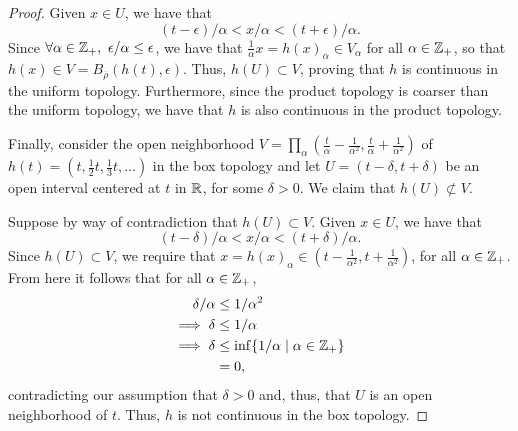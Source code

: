 \begin{solution}
\begin{proof}
        Given $x \in U$, we have that
        \begin{equation*}
            (t - \epsilon) / \alpha < x / \alpha < (t + \epsilon) / \alpha.
        \end{equation*}
        Since $\forall \alpha \in \mathbb{Z}_+,~ \epsilon / \alpha \leq \epsilon$, we have that $\tfrac{1}{\alpha} x = h(x)_\alpha \in V_\alpha$ for all $\alpha \in \mathbb{Z}_+$, so that $h(x) \in V = B_{\overline{\rho}}(h(t), \epsilon)$.
        Thus, $h(U) \subset V$, proving that $h$ is continuous in the uniform topology.
        Furthermore, since the product topology is coarser than the uniform topology, we have that $h$ is also continuous in the product topology.

        Finally, consider the open neighborhood $V = \prod_\alpha (\tfrac{t}{\alpha} - \tfrac{1}{\alpha^2}, \tfrac{t}{\alpha} + \tfrac{1}{\alpha^2})$ of $h(t) = (t, \tfrac{1}{2} t, \tfrac{1}{3} t, \ldots)$ in the box topology and let $U = (t - \delta, t + \delta)$ be an open interval centered at $t$ in $\mathbb{R}$, for some $\delta > 0$.
        We claim that $h(U) \not\subset V$.

        Suppose by way of contradiction that $h(U) \subset V$.
        Given $x \in U$, we have that
        \begin{equation*}
            (t - \delta) / \alpha < x / \alpha < (t + \delta) / \alpha.
        \end{equation*}
        Since $h(U) \subset V$, we require that $x = h(x)_\alpha \in (t - \tfrac{1}{\alpha^2}, t + \tfrac{1}{\alpha^2})$, for all $\alpha \in \mathbb{Z}_+$.
        From here it follows that for all $\alpha \in \mathbb{Z}_+$,
        \begin{align*}
            \delta / \alpha &\leq 1 / \alpha^2 \\
            \implies \delta &\leq 1 / \alpha \\
            \implies \delta &\leq \inf\{1 / \alpha \mid \alpha \in \mathbb{Z}_+\} \\
                            &= 0,
        \end{align*}
        contradicting our assumption that $\delta > 0$ and, thus, that $U$ is an open neighborhood of $t$.
        Thus, $h$ is not continuous in the box topology.
    \end{proof}
    \bigskip


\end{solution}

